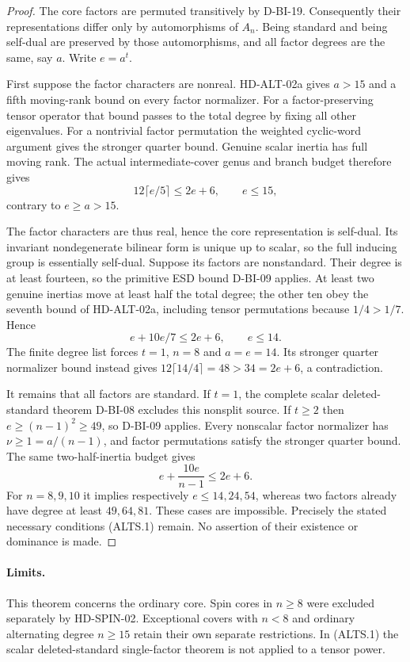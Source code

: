 \begin{proof}
The core factors are permuted transitively by D-BI-19.  Consequently
their representations differ only by automorphisms of $A_n$.
Being standard and being self-dual are preserved by those
automorphisms, and all factor degrees are the same, say $a$.
Write $e=a^t$.

First suppose the factor characters are nonreal.  HD-ALT-02a gives
$a>15$ and a fifth moving-rank bound on every factor normalizer.
For a factor-preserving tensor operator that bound passes to the
total degree by fixing all other eigenvalues.  For a nontrivial
factor permutation the weighted cyclic-word argument gives the
stronger quarter bound.  Genuine scalar inertia has full moving
rank.  The actual intermediate-cover genus and branch budget
therefore gives
\[
                 12\lceil e/5\rceil\le2e+6,
                 \qquad e\le15,
\]
contrary to $e\ge a>15$.

The factor characters are thus real, hence the core representation
is self-dual.  Its invariant nondegenerate bilinear form is unique
up to scalar, so the full inducing group is essentially self-dual.
Suppose its factors are nonstandard.  Their degree is at least
fourteen, so the primitive ESD bound D-BI-09 applies.  At least
two genuine inertias move at least half the total degree; the
other ten obey the seventh bound of HD-ALT-02a, including tensor
permutations because $1/4>1/7$.  Hence
\[
                   e+10e/7\le2e+6,
                   \qquad e\le14.                         \tag{ALTS.2}
\]
The finite degree list forces $t=1$, $n=8$ and $a=e=14$.
Its stronger quarter normalizer bound instead gives
$12\lceil14/4\rceil=48>34=2e+6$, a contradiction.

It remains that all factors are standard.  If $t=1$, the complete
scalar deleted-standard theorem D-BI-08 excludes this nonsplit
source.  If $t\ge2$ then $e\ge(n-1)^2\ge49$, so D-BI-09 applies.
Every nonscalar factor normalizer has $\nu\ge1=a/(n-1)$,
and factor permutations satisfy the stronger quarter bound.
The same two-half-inertia budget gives
\[
             e+\frac{10e}{n-1}\le2e+6.
\]
For $n=8,9,10$ it implies respectively $e\le14,24,54$,
whereas two factors already have degree at least $49,64,81$.
These cases are impossible.  Precisely the stated necessary
conditions (ALTS.1) remain.  No assertion of their existence or
dominance is made.
\end{proof}

\paragraph{Limits.}
This theorem concerns the ordinary core.  Spin cores in $n\ge8$
were excluded separately by HD-SPIN-02.  Exceptional covers with
$n<8$ and ordinary alternating degree $n\ge15$ retain their own
separate restrictions.  In (ALTS.1) the scalar deleted-standard
single-factor theorem is not applied to a tensor power.
